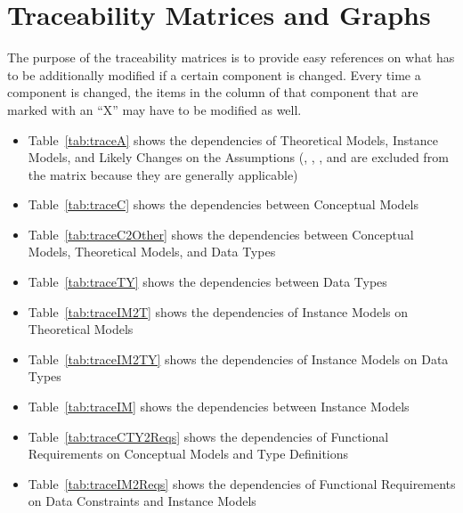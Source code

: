 \section{Traceability Matrices and Graphs}
\label{sec_trace}

The purpose of the traceability matrices is to provide easy references on what
has to be additionally modified if a certain component is changed.  Every time a
component is changed, the items in the column of that component that are marked
with an ``X'' may have to be modified as well.
\begin{itemize}
    \item Table~\ref{tab:traceA} shows the dependencies of Theoretical Models,
    Instance Models, and Likely Changes on the Assumptions
    (, , , and
     are excluded from the matrix because they are generally
    applicable)

    \item Table~\ref{tab:traceC} shows the dependencies between Conceptual
    Models

    \item Table~\ref{tab:traceC2Other} shows the dependencies between
    Conceptual Models, Theoretical Models, and Data Types

    \item Table~\ref{tab:traceTY} shows the dependencies between Data Types

    \item Table~\ref{tab:traceIM2T} shows the dependencies of Instance Models
    on Theoretical Models

    \item Table~\ref{tab:traceIM2TY} shows the dependencies of Instance Models
    on Data Types

    \item Table~\ref{tab:traceIM} shows the dependencies between Instance Models

    \item Table~\ref{tab:traceCTY2Reqs} shows the dependencies of Functional
    Requirements on Conceptual Models and Type Definitions

    \item Table~\ref{tab:traceIM2Reqs} shows the dependencies of Functional
    Requirements on Data Constraints and Instance Models

\end{itemize}

